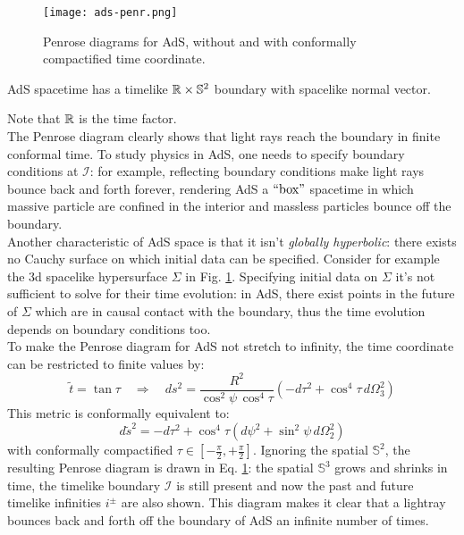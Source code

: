 \begin{figure}
  \centering
  \texttt{[image: ads-penr.png]}
  \caption{Penrose diagrams for AdS, without and with conformally compactified time coordinate.}
  \label{ads-penr}
\end{figure}

\begin{proposition}
  AdS spacetime has a timelike $ \mathbb{R} \times \mathbb{S}^2 $ boundary with spacelike normal vector.
\end{proposition}

Note that $ \mathbb{R} $ is the time factor.\\
The Penrose diagram clearly shows that light rays reach the boundary in finite conformal time. To study physics in AdS, one needs to specify boundary conditions at $ \mathcal{I} $: for example, reflecting boundary conditions make light rays bounce back and forth forever, rendering AdS a $ ``\text{box}" $ spacetime in which massive particle are confined in the interior and massless particles bounce off the boundary.\\
Another characteristic of AdS space is that it isn't \textit{globally hyperbolic}: there exists no Cauchy surface on which initial data can be specified. Consider for example the 3d spacelike hypersurface $ \Sigma $ in Fig. \ref{ads-penr}. Specifying initial data on $ \Sigma $ it's not sufficient to solve for their time evolution: in AdS, there exist points in the future of $ \Sigma $ which are in causal contact with the boundary, thus the time evolution depends on boundary conditions too.\\
To make the Penrose diagram for AdS not stretch to infinity, the time coordinate can be restricted to finite values by:
\begin{equation*}
  \tilde{t} = \tan \tau
  \quad \Rightarrow \quad
  ds^2 = \frac{R^2}{\cos^2 \psi \, \cos^4 \tau} \left( -d\tau^2 + \cos^4 \tau \, d\Omega_3^2 \right)
\end{equation*}
This metric is conformally equivalent to:
\begin{equation*}
  d\tilde{s}^2 = - d\tau^2 + \cos^4 \tau \left( d\psi^2 + \sin^2 \psi \, d\Omega_2^2 \right)
\end{equation*}
with conformally compactified $ \tau \in \left[ - \frac{\pi}{2}, + \frac{\pi}{2} \right] $. Ignoring the spatial $ \mathbb{S}^2 $, the resulting Penrose diagram is drawn in Eq. \ref{ads-penr}: the spatial $ \mathbb{S}^3 $ grows and shrinks in time, the timelike boundary $ \mathcal{I} $ is still present and now the past and future timelike infinities $ i^{\pm} $ are also shown. This diagram makes it clear that a lightray bounces back and forth off the boundary of AdS an infinite number of times.

